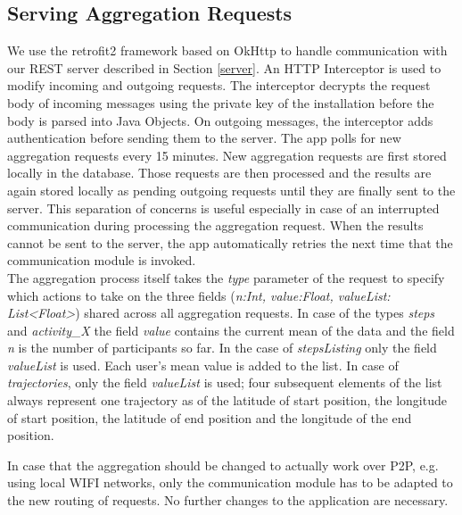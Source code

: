\subsection{Serving Aggregation Requests}
We use the retrofit2 framework \parencite{retrofit} based on OkHttp \parencite{okhttp} to handle communication with our REST server described in Section \ref{server}. An HTTP Interceptor is used to modify incoming and outgoing requests. The interceptor decrypts the request body of incoming messages using the private key of the installation before the body is parsed into Java Objects. On outgoing messages, the interceptor adds authentication before sending them to the server.
The app polls for new aggregation requests every 15 minutes. New aggregation requests are first stored locally in the database. Those requests are then processed and the results are again stored locally as pending outgoing requests until they are finally sent to the server. This separation of concerns is useful especially in case of an interrupted communication during processing the aggregation request. When the results cannot be sent to the server, the app automatically retries the next time that the communication module is invoked.\\
The aggregation process itself takes the \textit{type} parameter of the request to specify which actions to take on the three fields (\textit{n:Int, value:Float, valueList: List<Float>}) shared across all aggregation requests. In case of the types \textit{steps} and \textit{activity\_X} the field \textit{value} contains the current mean of the data and the field \textit{n} is the number of participants so far. In the case of \textit{stepsListing} only the field \textit{valueList} is used. Each user's mean value is added to the list. In case of \textit{trajectories}, only the field \textit{valueList} is used; four subsequent elements of the list always represent one trajectory as of the latitude of start position, the longitude of start position, the latitude of end position and the longitude of the end position.

In case that the aggregation should be changed to actually work over P2P, e.g. using local WIFI networks, only the communication module has to be adapted to the new routing of requests. No further changes to the application are necessary.

